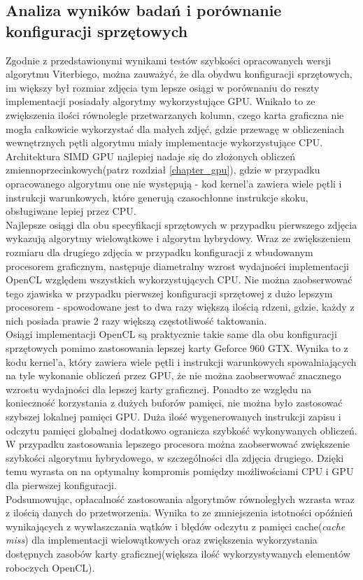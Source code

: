 \documentclass[document.tex]{subfiles}
\begin{document}
\subsection{Analiza wyników badań i porównanie konfiguracji sprzętowych}
\indent Zgodnie z przedstawionymi wynikami testów szybkości opracowanych wersji algorytmu Viterbiego, 
można zauważyć, że dla obydwu konfiguracji sprzętowych, im większy był rozmiar zdjęcia tym lepsze
osiągi w porównaniu do reszty implementacji posiadały algorytmy wykorzystujące GPU.
Wnikało to ze zwiększenia ilości równolegle przetwarzanych kolumn, czego karta graficzna nie mogła
całkowicie wykorzystać dla małych zdjęć, gdzie przewagę w obliczeniach wewnętrznych pętli algorytmu
miały implementacje wykorzystujące CPU. Architektura SIMD GPU najlepiej nadaje się do złożonych 
obliczeń zmiennoprzecinkowych(patrz rozdział \ref{chapter_gpu}), gdzie w przypadku opracowanego algorytmu
one nie występują - kod kernel'a zawiera wiele pętli i instrukcji warunkowych, które 
generują czasochłonne instrukcje skoku, obsługiwane lepiej przez CPU. 
\\
\indent Najlepsze osiągi dla obu specyfikacji sprzętowych w przypadku pierwszego zdjęcia 
wykazują algorytmy wielowątkowe i algorytm hybrydowy. Wraz ze zwiększeniem rozmiaru dla drugiego zdjęcia
w przypadku konfiguracji z wbudowanym procesorem graficznym, następuje diametralny wzrost wydajności 
implementacji OpenCL względem wszystkich wykorzystujących CPU. Nie można zaobserwować tego zjawiska
w przypadku pierwszej konfiguracji sprzętowej z dużo lepszym procesorem - spowodowane jest to dwa razy większą ilością rdzeni, 
gdzie, każdy z nich posiada prawie 2 razy większą częstotliwość taktowania. 
\\
\indent Osiągi implementacji OpenCL są praktycznie takie same dla obu konfiguracji sprzętowych 
pomimo zastosowania lepszej karty Geforce 960 GTX.
Wynika to z kodu kernel'a, który zawiera wiele pętli i instrukcji warunkowych spowalniających na tyle
wykonanie obliczeń przez GPU, że nie można zaobserwować znacznego wzrostu wydajności dla lepszej karty graficznej.
Ponadto ze względu na konieczność korzystania z dużych buforów pamięci, nie można było zastosować 
szybszej lokalnej pamięci GPU. Duża ilość wygenerowanych instrukcji zapisu i odczytu pamięci globalnej 
dodatkowo ogranicza szybkość wykonywanych obliczeń.
\\
\indent W przypadku zastosowania lepszego procesora można zaobserwować zwiększenie
szybkości algorytmu hybrydowego, w szczególności dla zdjęcia drugiego. Dzięki temu
wyrasta on na optymalny kompromis pomiędzy możliwościami CPU i GPU dla pierwszej konfiguracji.
\\
\indent Podsumowując, opłacalność zastosowania algorytmów równoległych wzrasta wraz z ilością
danych do przetworzenia. Wynika to ze zmniejszenia istotności opóźnień wynikających z wywłaszczania wątków i
błędów odczytu z pamięci cache(\textit{cache miss}) dla implementacji wielowątkowych oraz
zwiększenia wykorzystania dostępnych zasobów karty graficznej(większa ilość wykorzystywanych elementów roboczych OpenCL).
\end{document}
